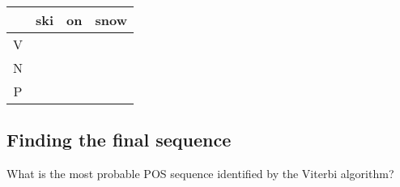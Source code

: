 \documentclass{article}
\newcommand{\fillspace}{\hspace{.95in}}
\newcommand{\cellspace}{\Gape[1in]}
\begin{document}
\begin{table}[!ht]
    \centering
    \begin{tabular}{|c|@{\fillspace}c@{\fillspace}|@{\fillspace}c@{\fillspace}|@{\fillspace}c@{\fillspace}|} \hline 
         &   ski&  on& snow\\ \hline
         V&  \cellspace &  & \\ \hline 
         N&  \cellspace &  & \\ \hline 
         P&  \cellspace &  & \\ \hline 
    \end{tabular}
    \label{tab:my_label}
\end{table}
\subsection{Finding the final sequence}
What is the most probable POS sequence identified by the Viterbi algorithm?
\end{document}

